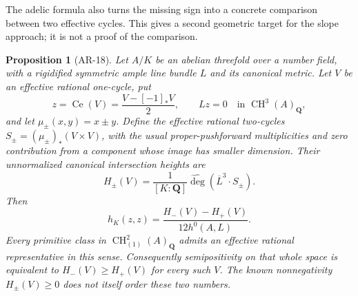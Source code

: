 \documentclass[11pt,a4paper]{article}
\newtheorem{proposition}[theorem]{Proposition}
\begin{document}
The adelic formula also turns the missing sign into a concrete comparison
between two effective cycles. This gives a second geometric target for
the slope approach; it is not a proof of the comparison.

\begin{proposition}[AR-18]
Let $A/K$ be an abelian threefold over a number field, with a rigidified
symmetric ample line bundle $L$ and its canonical metric. Let $V$ be an
effective rational one-cycle, put
\[
 z=\operatorname{Ce}(V)=\frac{V-[-1]_*V}{2},
 \qquad Lz=0\quad\text{in }\operatorname{CH}^3(A)_{\mathbf Q},
\]
and let $\mu_\pm(x,y)=x\pm y$. Define the effective rational two-cycles
$S_\pm=(\mu_\pm)_*(V\times V)$, with the usual proper-pushforward
multiplicities and zero contribution from a component whose image has
smaller dimension. Their unnormalized canonical intersection heights are
\[
 H_\pm(V)=\frac1{[K:\mathbf Q]}
       \widehat{\deg}(\overline L^3\cdot S_\pm).
\]
Then
\[
 h_K(z,z)=\frac{H_-(V)-H_+(V)}{12h^0(A,L)}.                 \tag{AR.34}
\]
Every primitive class in $\operatorname{CH}^2_{(1)}(A)_{\mathbf Q}$
admits an effective rational representative in this sense. Consequently
semipositivity on that whole space is equivalent to
$H_-(V)\ge H_+(V)$ for every such $V$. The known nonnegativity
$H_\pm(V)\ge0$ does not itself order these two numbers.
\end{proposition}
\end{document}
